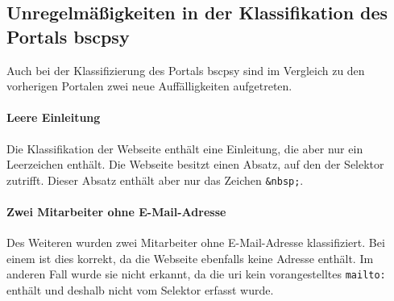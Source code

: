 \subsection{Unregelmäßigkeiten in der Klassifikation des Portals \acrshort{bscpsy}}
    Auch bei der Klassifizierung des Portals \gls{bscpsy}
    sind im Vergleich zu den vorherigen Portalen zwei neue
    Auffälligkeiten aufgetreten.

    \paragraph*{Leere Einleitung}
        Die Klassifikation der Webseite enthält eine Einleitung,
        die aber nur ein Leerzeichen enthält.
        Die Webseite besitzt einen Absatz,
        auf den der Selektor zutrifft.
        Dieser Absatz enthält aber nur das Zeichen \texttt{\&nbsp;}.

    \paragraph*{Zwei Mitarbeiter ohne E-Mail-Adresse}
        Des Weiteren wurden zwei Mitarbeiter ohne E-Mail-Adresse klassifiziert.
        Bei einem ist dies korrekt, da die Webseite ebenfalls keine Adresse enthält.
        Im anderen Fall wurde sie nicht erkannt,
        da die \gls{uri} kein vorangestelltes \texttt{mailto:} enthält
        und deshalb nicht vom Selektor erfasst wurde.
        